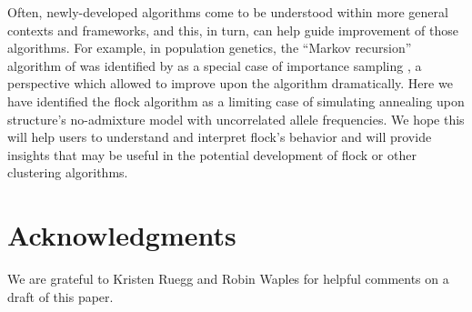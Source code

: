 Often, newly-developed algorithms come to be understood within more general contexts and 
frameworks, and this, in turn, can help guide improvement of those algorithms.  For example, in population
genetics, the ``Markov recursion'' algorithm of \citet{Gri&Tav1994-AI} was identified by \citet{Felsensteinetal1999} 
as a special case of importance sampling \citep{Ham&Han1964}, a perspective which allowed 
\citet{Ste&Don2000} to improve upon the algorithm dramatically.  Here we have identified the {\sc flock}
algorithm as a limiting case of simulating annealing upon {\sc structure}'s no-admixture model with uncorrelated
allele frequencies. We hope this will
help users to understand and interpret {\sc flock}'s behavior and will provide insights that may be useful 
in the potential development of {\sc flock} or other clustering algorithms.   


\section*{Acknowledgments}
We are grateful to Kristen Ruegg and Robin Waples for helpful comments on a draft of this paper.